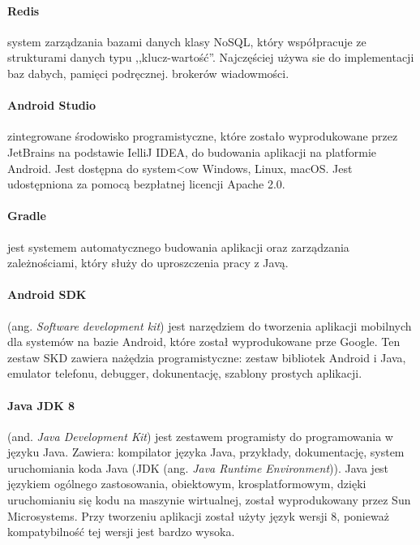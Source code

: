 \paragraph{Redis} \cite{redis} system zarządzania bazami danych klasy NoSQL, który współpracuje ze strukturami danych typu ,,klucz-wartość''. Najczęściej używa sie do implementacji baz dabych, pamięci podręcznej. brokerów wiadowmości.

\paragraph{Android Studio} \cite{android_doc,android_studio} zintegrowane środowisko programistyczne, które zostało wyprodukowane przez JetBrains na podstawie IelliJ IDEA, do budowania aplikacji na platformie Android. Jest dostępna do system<ow Windows, Linux, macOS. Jest udostępniona za pomocą bezpłatnej licencji Apache 2.0.

\paragraph{Gradle} \cite{gradle,gradle_android_doc} jest systemem automatycznego budowania aplikacji oraz zarządzania zależnościami, który służy do uproszczenia pracy z Javą.

\paragraph{Android SDK} \cite{android_studio} (ang. \textit{Software development kit}) jest narzędziem do tworzenia aplikacji mobilnych dla systemów na bazie Android, które został wyprodukowane prze Google.
Ten zestaw SKD zawiera nażędzia programistyczne: zestaw bibliotek Android i Java, emulator telefonu, debugger, dokunentację, szablony prostych aplikacji.

\paragraph{Java JDK 8} (and. \textit{Java Development Kit}) \cite{java_doc} jest zestawem programisty do programowania w języku Java. Zawiera: kompilator języka Java, przykłady, dokumentację, system uruchomiania koda Java (JDK (ang. \textit{Java Runtime Environment})).
Java jest językiem ogólnego zastosowania, obiektowym, krosplatformowym, dzięki uruchomianiu się kodu na maszynie wirtualnej, został wyprodukowany przez Sun Microsystems.
Przy tworzeniu aplikacji został użyty język wersji 8, ponieważ kompatybilność tej wersji jest bardzo wysoka.

